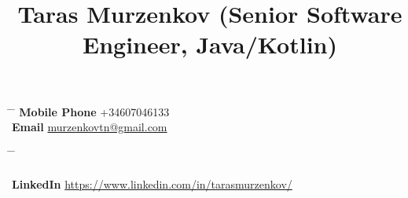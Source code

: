 \documentclass[10pt]{article} %
\begin{document}


\title{Taras Murzenkov (Senior Software Engineer, Java/Kotlin) } %


\parbox{0.2\textwidth}{ %
\begin{tabbing} %
\hspace{3cm} \= \hspace{4cm} \= \kill %
{\bf Mobile Phone} \>+34607046133\\ 
{\bf Email} \> \href{mailto:murzenkovtn@gmail.com}{murzenkovtn@gmail.com} %

\end{tabbing}}
\hfill %
\parbox{0.5\textwidth}{ %
\begin{tabbing} %
\hspace{3cm} \= \hspace{4cm} \= \kill %
\\ %
\\{\bf LinkedIn} \> \href{https://www.linkedin.com/in/tarasmurzenkov/}{https://www.linkedin.com/in/tarasmurzenkov/} %
\end{tabbing}}

\end{document}
